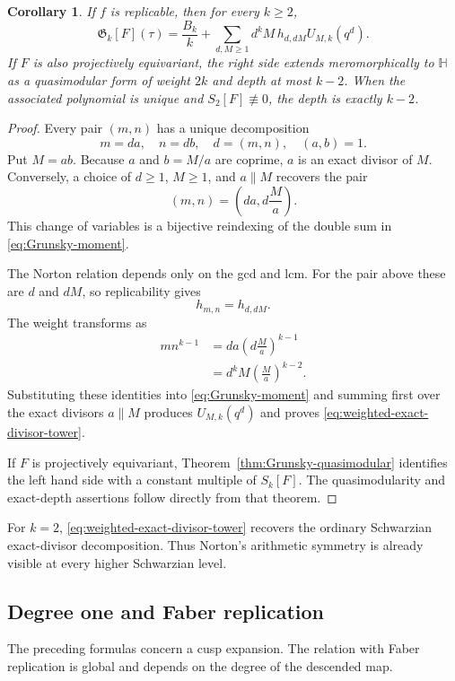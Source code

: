 \documentclass[11pt]{amsart}
\newtheorem{cor}[thm]{Corollary}
\theoremstyle{definition}
\theoremstyle{remark}
\numberwithin{equation}{section}
\begin{document}
\begin{cor}\label{cor:replicable-Grunsky-tower}
If $f$ is replicable, then for every $k\geq2$,
\begin{equation}\label{eq:weighted-exact-divisor-tower}
\mathfrak G_k[F](\tau)
=
\frac{B_k}{k}
+
\sum_{d,M\geq1}
 d^kM\,h_{d,dM}U_{M,k}(q^d).
\end{equation}
If $F$ is also projectively equivariant, the right side extends meromorphically to $\mathbb H$ as a quasimodular form of weight $2k$ and depth at most $k-2$. When the associated polynomial is unique and $S_2[F]\not\equiv0$, the depth is exactly $k-2$.
\end{cor}

\begin{proof}
Every pair $(m,n)$ has a unique decomposition
\[
m=da,\quad n=db,
\quad d=(m,n),\quad (a,b)=1.
\]
Put $M=ab$. Because $a$ and $b=M/a$ are coprime, $a$ is an exact divisor of $M$. Conversely, a choice of $d\geq1$, $M\geq1$, and $a\parallel M$ recovers the pair
\[
(m,n)=\left(da,d\frac{M}{a}\right).
\]
This change of variables is a bijective reindexing of the double sum in \eqref{eq:Grunsky-moment}.

The Norton relation depends only on the gcd and lcm. For the pair above these are $d$ and $dM$, so replicability gives
\[
h_{m,n}=h_{d,dM}.
\]
The weight transforms as
\begin{align*}
m n^{k-1}
&=da\left(d\frac{M}{a}\right)^{k-1}\\
&=d^kM\left(\frac{M}{a}\right)^{k-2}.
\end{align*}
Substituting these identities into \eqref{eq:Grunsky-moment} and summing first over the exact divisors $a\parallel M$ produces $U_{M,k}(q^d)$ and proves \eqref{eq:weighted-exact-divisor-tower}.

If $F$ is projectively equivariant, Theorem~\ref{thm:Grunsky-quasimodular} identifies the left hand side with a constant multiple of $S_k[F]$. The quasimodularity and exact-depth assertions follow directly from that theorem.
\end{proof}

For \(k=2\), \eqref{eq:weighted-exact-divisor-tower} recovers the ordinary Schwarzian exact-divisor decomposition. Thus Norton's arithmetic symmetry is already visible at every higher Schwarzian level.

\subsection{Degree one and Faber replication}
The preceding formulas concern a cusp expansion. The relation with Faber replication is global and depends on the degree of the descended map.
\end{document}
